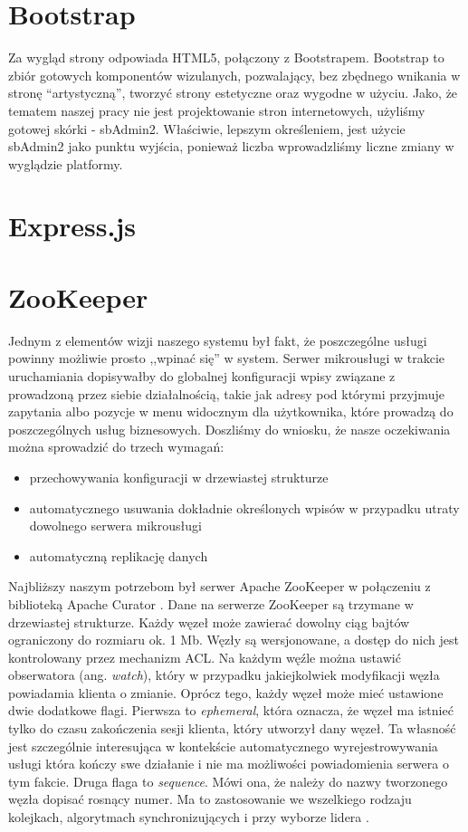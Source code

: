 \documentclass[licencjacka]{pracamgr}
\begin{document}
\section{Bootstrap}

Za wygląd strony odpowiada HTML5, połączony z Bootstrapem. Bootstrap to zbiór gotowych komponentów wizulanych, pozwalający, bez zbędnego wnikania
w stronę ``artystyczną'', tworzyć strony estetyczne oraz wygodne w użyciu. Jako, że tematem naszej pracy nie jest projektowanie stron internetowych,
użyliśmy gotowej skórki - sbAdmin2. Właściwie, lepszym określeniem, jest użycie sbAdmin2 jako punktu wyjścia, ponieważ liczba wprowadzliśmy
liczne zmiany w wyglądzie platformy.

\section{Express.js}

\section{ZooKeeper}

Jednym z elementów wizji naszego systemu był fakt, że poszczególne usługi
powinny możliwie prosto ,,wpinać się'' w system. Serwer mikrousługi w trakcie
uruchamiania dopisywałby do globalnej konfiguracji wpisy związane z prowadzoną
przez siebie działalnością, takie jak adresy pod którymi przyjmuje zapytania
albo pozycje w menu widocznym dla użytkownika, które prowadzą do poszczególnych
usług biznesowych. Doszliśmy do wniosku, że nasze oczekiwania można sprowadzić
do trzech wymagań:
\begin{itemize}
	\item przechowywania konfiguracji w drzewiastej strukturze
	\item automatycznego usuwania dokładnie określonych wpisów w przypadku
	utraty dowolnego serwera mikrousługi
	\item automatyczną replikację danych
\end{itemize}

Najbliższy naszym potrzebom był serwer Apache ZooKeeper \cite{zookeeper} w
połączeniu z biblioteką Apache Curator \cite{curator}. Dane na serwerze
ZooKeeper są trzymane w drzewiastej strukturze. Każdy węzeł może zawierać dowolny
ciąg bajtów ograniczony do rozmiaru ok. 1 Mb. Węzły są wersjonowane, a dostęp
do nich jest kontrolowany przez mechanizm ACL. Na każdym węźle można ustawić
obserwatora (ang. \textit{watch}), który w przypadku jakiejkolwiek modyfikacji
węzła powiadamia klienta o zmianie. Oprócz tego, każdy węzeł może mieć ustawione
dwie dodatkowe flagi. Pierwsza to \textit{ephemeral}, która oznacza, że węzeł ma
istnieć tylko do czasu zakończenia sesji klienta, który utworzył dany węzeł.
Ta własność jest szczególnie interesująca w kontekście automatycznego
wyrejestrowywania usługi która kończy swe działanie i nie ma możliwości
powiadomienia serwera o tym fakcie. Druga flaga to \textit{sequence}. Mówi ona,
że należy do nazwy tworzonego węzła dopisać rosnący numer. Ma to zastosowanie we
wszelkiego rodzaju kolejkach, algorytmach synchronizujących i przy wyborze
lidera \cite{curatorlock}.
\end{document}
